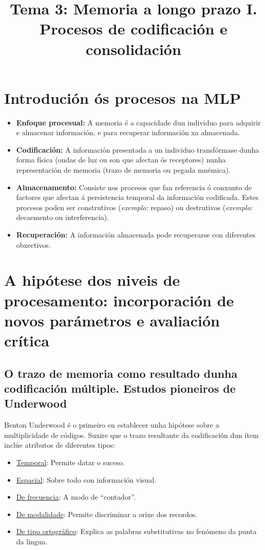 \documentclass[a4paper,11pt]{article}
\title{Tema 3: Memoria a longo prazo I. Procesos de codificación e consolidación}
\date{}
\begin{document}
  

\maketitle 

\section{Introdución ós procesos na MLP}
\begin{itemize}
	\item \textbf{Enfoque procesual:} A memoria é a capacidade dun individuo para adquirir e 				almacenar información, e para recuperar información xa almacenada. 
	\item \textbf{Codificación:} A información presentada a un individuo transfórmase dunha forma
	física (ondas de luz ou son que afectan ós receptores) nunha representación de memoria (trazo de
	memoria ou pegada mnémica). 
	\item \textbf{Almacenamento:} Consiste nos procesos que fan referencia ó conxunto de factores
	que afectan á persistencia temporal da información codificada. Estes procesos poden ser
	construtivos (\textit{exemplo:} repaso) ou destrutivos (\textit{exemplo:} decaemento ou
	interferencia).
	\item \textbf{Recuperación:} A información almacenada pode recuperarse con diferentes obxectivos.
\end{itemize}

\section{A hipótese dos niveis de procesamento: incorporación de novos parámetros e avaliación crítica}
\subsection{O trazo de memoria como resultado dunha codificación múltiple. Estudos pioneiros de Underwood}
Benton Underwood é o primeiro en establecer unha hipótese sobre a multiplicidade de códigos. Suxire que o trazo resultante da codificación dun ítem inclúe atributos de diferentes tipos:
\begin{itemize}
	\item \underline{Temporal}: Permite datar o suceso.
	\item \underline{Espacial}: Sobre todo con información visual.
	\item \underline{De frecuencia}: A modo de ``contador''.
	\item \underline{De modalidade}: Permite discriminar a orixe dos recordos.
	\item \underline{De tipo ortográfico}: Explica as palabras substitutivas no fenómeno da punta da
	lingua.
\end{itemize}
\end{document}
